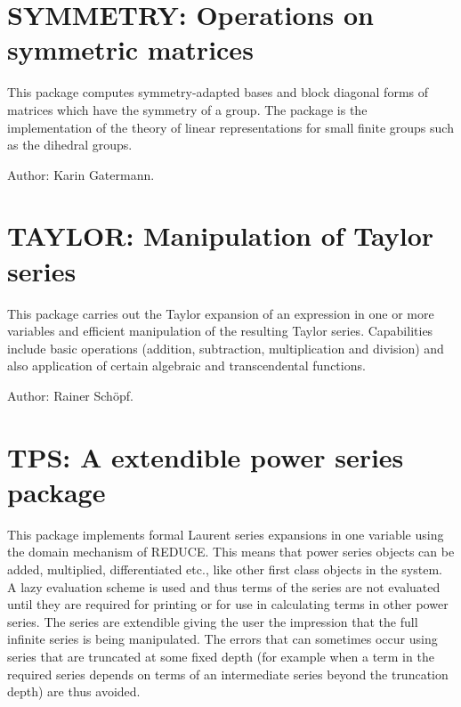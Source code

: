 \newpage

\section{SYMMETRY: Operations on symmetric matrices} 

This package computes symmetry-adapted bases and block diagonal forms of
matrices which have the symmetry of a group.  The package is the
implementation of the theory of linear representations for small finite
groups such as the dihedral groups.

Author: Karin Gatermann.


\newpage

\section{TAYLOR: Manipulation of Taylor series}

 

This package carries out the Taylor expansion of an expression in one or
more variables and efficient manipulation of the resulting Taylor series.
Capabilities include basic operations (addition, subtraction,
multiplication and division) and also application of certain algebraic and
transcendental functions.

Author: Rainer Sch\"opf.


\newpage

\section{TPS: A extendible power series package} 

This package implements formal Laurent series expansions in one variable
using the domain mechanism of REDUCE.  This means that power series
objects can be added, multiplied, differentiated etc.,  like other first
class objects in the system.  A lazy evaluation scheme is used and thus
terms of the series are not evaluated until they are required for printing
or for use in calculating terms in other power series.  The series are
extendible giving the user the impression that the full infinite series is
being manipulated.  The errors that can sometimes occur using series that
are truncated at some fixed depth (for example when a term in the required
series depends on terms of an intermediate series beyond the truncation
depth) are thus avoided.

